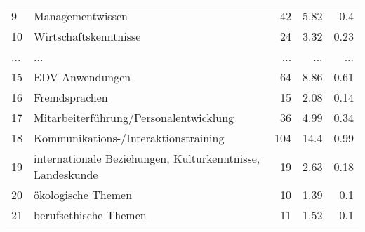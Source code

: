 \begin{longtable}{lXrrr}
        9 & \multicolumn{1}{X}{Managementwissen} & %
          \num{42} &
          \num[round-mode=places,round-precision=2]{5,82} &
          \num[round-mode=places,round-precision=2]{0,4} \\
        10 & \multicolumn{1}{X}{Wirtschaftskenntnisse} & %
          \num{24} &
          \num[round-mode=places,round-precision=2]{3,32} &
          \num[round-mode=places,round-precision=2]{0,23} \\
       ... & ... & ... & ... & ... \\
        15 & \multicolumn{1}{X}{EDV-Anwendungen} & %
          \num{64} &
          \num[round-mode=places,round-precision=2]{8,86} &
          \num[round-mode=places,round-precision=2]{0,61} \\

        16 & \multicolumn{1}{X}{Fremdsprachen} & %
          \num{15} &
          \num[round-mode=places,round-precision=2]{2,08} &
          \num[round-mode=places,round-precision=2]{0,14} \\

        17 & \multicolumn{1}{X}{Mitarbeiterführung/Personalentwicklung} & %
          \num{36} &
          \num[round-mode=places,round-precision=2]{4,99} &
          \num[round-mode=places,round-precision=2]{0,34} \\

        18 & \multicolumn{1}{X}{Kommunikations-/Interaktionstraining} & %
          \num{104} &
          \num[round-mode=places,round-precision=2]{14,4} &
          \num[round-mode=places,round-precision=2]{0,99} \\

        19 & \multicolumn{1}{X}{internationale Beziehungen, Kulturkenntnisse, Landeskunde} & %
          \num{19} &
          \num[round-mode=places,round-precision=2]{2,63} &
          \num[round-mode=places,round-precision=2]{0,18} \\

        20 & \multicolumn{1}{X}{ökologische Themen} & %
          \num{10} &
          \num[round-mode=places,round-precision=2]{1,39} &
          \num[round-mode=places,round-precision=2]{0,1} \\

        21 & \multicolumn{1}{X}{berufsethische Themen} & %
          \num{11} &
          \num[round-mode=places,round-precision=2]{1,52} &
          \num[round-mode=places,round-precision=2]{0,1} \\


\end{longtable}
